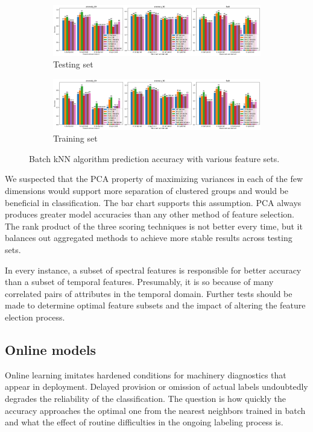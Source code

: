 \begin{figure}[ht]
    \centering
    \begin{subfigure}[b]{\textwidth}
        \includegraphics[width=\textwidth]{assets/design/kNN-feature-selection-predictions-train.png}
        \caption{Testing set}
    \end{subfigure}
    \hfill
    \begin{subfigure}[b]{\textwidth}
        \includegraphics[width=\textwidth]{assets/design/kNN-feature-selection-predictions-test.png}
        \caption{Training set}
    \end{subfigure} 
    \caption{Batch kNN algorithm prediction accuracy with various feature sets.}
    \label{fig:design:knn-accuracy-batch}
\end{figure} 

We suspected that the PCA property of maximizing variances in each of the few dimensions would support more separation of clustered groups and would be beneficial in classification. The bar chart supports this assumption. PCA always produces greater model accuracies than any other method of feature selection. The rank product of the three scoring techniques is not better every time, but it balances out aggregated methods to achieve more stable results across testing sets. 

In every instance, a subset of spectral features is responsible for better accuracy than a subset of temporal features. Presumably, it is so because of many correlated pairs of attributes in the temporal domain. Further tests should be made to determine optimal feature subsets and the impact of altering the feature election process.


\subsection{Online models}
Online learning imitates hardened conditions for machinery diagnostics that appear in deployment. Delayed provision or omission of actual labels undoubtedly degrades the reliability of the classification. The question is how quickly the accuracy approaches the optimal one from the nearest neighbors trained in batch and what the effect of routine difficulties in the ongoing labeling process is.

